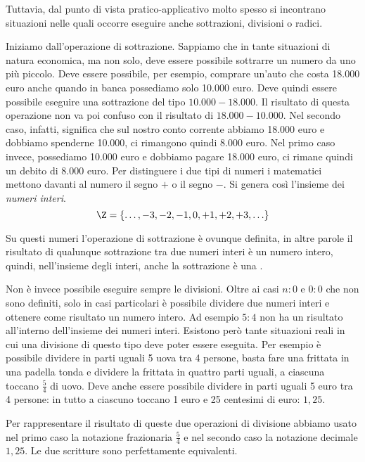 Tuttavia, dal punto di vista pratico-applicativo molto spesso si incontrano 
situazioni nelle quali occorre eseguire anche sottrazioni, divisioni o 
radici. 

Iniziamo dall'operazione di sottrazione. Sappiamo che in tante situazioni 
di natura economica, ma non solo, deve essere possibile sottrarre un numero 
da uno più piccolo. 
Deve essere possibile, per esempio, comprare un'auto che costa 
18.000 euro anche quando in banca possediamo solo 10.000 euro. 
Deve quindi essere possibile eseguire una sottrazione del tipo 
\(10.000-18.000\). 
Il risultato di questa operazione non va poi confuso con il risultato di 
\(18.000-10.000\). 
Nel secondo caso, infatti, significa che sul nostro conto corrente abbiamo 
18.000 euro e dobbiamo spenderne 10.000, ci rimangono quindi 8.000 euro. 
Nel primo caso invece, possediamo 10.000 euro e dobbiamo pagare 
18.000 euro, ci rimane quindi un debito di 8.000 euro. 
Per distinguere i due tipi di numeri i matematici mettono davanti al numero 
il segno \(+\) o il segno \(-\). 
Si genera così l'insieme dei \emph{numeri interi}.
\[\Z=\{\ldots,-3,-2,-1,0,+1,+2,+3,\ldots\}\]

Su questi numeri l'operazione di sottrazione è ovunque definita, in altre 
parole il risultato di qualunque sottrazione tra due numeri interi è un 
numero intero, quindi, nell'insieme degli interi, anche la sottrazione è una 
.

Non è invece possibile eseguire sempre le divisioni. Oltre ai casi \(n:0\) e 
\(0:0\) che non sono definiti, solo in casi particolari è possibile dividere 
due numeri interi e ottenere come risultato un numero intero. Ad esempio 
\(5:4\) non ha un risultato all'interno dell'insieme dei numeri interi. 
Esistono però tante situazioni reali in cui una divisione di questo tipo 
deve poter essere eseguita. 
Per esempio è possibile dividere in parti uguali 5 uova tra 4 persone, basta 
fare una frittata in una padella tonda e dividere la frittata in quattro 
parti uguali, a ciascuna toccano \(\frac{5}{4}\) di uovo. 
Deve anche essere possibile dividere in parti uguali 5 euro tra 4 persone: 
in tutto a ciascuno toccano 1 euro e 25 centesimi di euro: \(1,25\).

Per rappresentare il risultato di queste due operazioni di divisione abbiamo 
usato nel primo caso la notazione frazionaria \(\frac{5}{4}\) e nel secondo 
caso la notazione decimale \(1,25\). Le due scritture sono perfettamente 
equivalenti.

